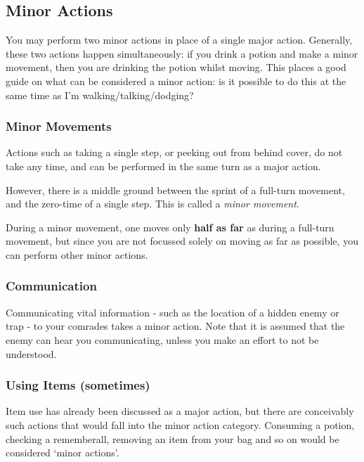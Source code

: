 \subsection{Minor Actions}
You may perform two minor actions in place of a single major action. Generally, these two actions happen simultaneously: if you drink a potion and make a minor movement, then you are drinking the potion whilst moving. This places a good guide on what can be considered a minor action: is it possible to do this at the same time as I'm walking/talking/dodging? 

\subsubsection{Minor Movements} 

Actions such as taking a single step, or peeking out from behind cover, do not take any time, and can be performed in the same turn as a major action. 

However, there is a middle ground between the sprint of a full-turn movement, and the zero-time of a single step. This is called a {\it minor movement}. 

During a minor movement, one moves only {\bf half as far} as during a full-turn movement, but since you are not focussed solely on moving as far as possible, you can perform other minor actions. 

\subsubsection{Communication} 

Communicating vital information - such as the location of a hidden enemy or trap - to your comrades takes a minor action. Note that it is assumed that the enemy can hear you communicating, unless you make an effort to not be understood. 

\subsubsection{Using Items (sometimes)}

Item use has already been discussed as a major action, but there are conceivably such actions that would fall into the minor action category. Consuming a potion, checking a rememberall, removing an item from your bag and so on would be considered `minor actions'. 

